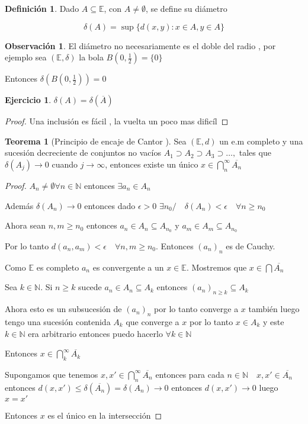 \documentclass[12pt]{article}
\newcommand{\E}{\mathbb{E}}
\newcommand{\N}{\mathbb{N}}
\newcommand{\ra}{\rightarrow}
\newcommand{\ol}{\overline}
\theoremstyle{definition}
\newtheorem{definition}{Definición}[section]
\newtheorem*{remark}{Observación}
\newtheorem{theorem}{Teorema}
\newtheorem{ej}{Ejercicio}
\begin{document}
\begin{definition}
  Dado $A \subseteq \E$, con $A \neq \emptyset$, se define su diámetro

  $$ \delta(A) = \sup \{d(x,y) : x \in A , y \in A\}$$
\end{definition}
\begin{remark}
  El diámetro no necesariamente es el doble del radio , por ejemplo sea $(\E,\delta)$ la bola $B(0,\frac{1}{2}) = \{0\}$

  Entonces $\delta(B(0,\frac{1}{2})) = 0$
\end{remark}
\begin{ej}
  $\delta(A) = \delta (\ol A)$
  \begin{proof}
    Una inclusión es fácil , la vuelta un poco mas dificíl
  \end{proof}
\end{ej}
\begin{theorem}[Principio de encaje de Cantor ]
  Sea $(\E,d)$ un e.m completo y una sucesión decreciente de conjuntos no vacíos $A_1 \supset A_2 \supset A_3 \supset \dots ,$ tales que $\delta(A_j) \ra 0$ cuando $j \ra \infty$, entonces existe un único $x \in \bigcap_n^{\infty} \ol{A_n}$
\end{theorem}
\begin{proof}
  $A_n \neq \emptyset \forall n \in\N$ entonces $\exists a_n \in A_n$

  Además $\delta (A_n) \ra 0$ entonces dado $\epsilon >0$ $\exists n_0/ \quad \delta(A_n) < \epsilon \quad \forall n \geq n_0$

  Ahora sean $n,m \geq n_0$ entonces $a_n \in A_n \subseteq A_{n_0}$ y $a_m \in A_m \subseteq A_{n_0}$

  Por lo tanto $d(a_n,a_m ) < \epsilon \quad \forall n,m \geq n_0$. Entonces $(a_n)_n$ es de Cauchy.

  Como  $\E$ es completo $a_n$ es convergente a un $x \in \E$. Mostremos que $x \in \bigcap \ol{A_n}$

  Sea $k \in \N$. Si $n \geq k$ sucede $a_n \in A_n \subseteq A_k$ entonces $(a_n)_{n \geq k} \subseteq A_k$

Ahora esto es un subsucesión de $(a_n)_n$ por lo tanto converge a $x$ también luego tengo una sucesión contenida $A_k$ que converge a $x$ por lo tanto $x \in A_k$ y este $k \in \N$ era arbitrario entonces puedo hacerlo $\forall k \in \N$

Entonces $x \in \bigcap_k^{\infty} \ol{A_k}$

Supongamos que tenemos $x, x' \in \bigcap_n^{\infty} \ol{A_n}$ entonces para cada $n\in\N \quad x,x' \in \ol{A_n}$ entonces $d(x,x') \leq \delta(\ol{A_n}) = \delta(A_n) \ra 0$ entonces $d(x,x') \ra 0$ luego $x = x'$

Entonces $x $ es el único en la intersección
\end{proof}
\end{document}

